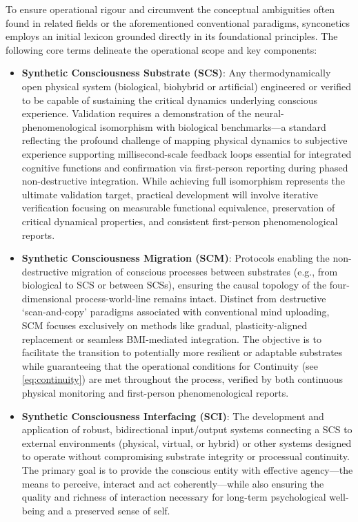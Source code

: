 \documentclass[10pt]{article}
\begin{document}
\begin{sloppypar}
  To ensure operational rigour and circumvent the conceptual ambiguities often found in related fields or the aforementioned conventional paradigms, synconetics employs an initial lexicon grounded directly in its foundational principles. The following core terms delineate the operational scope and key components:

  \begin{itemize}
    \item \textbf{Synthetic Consciousness Substrate (SCS)}: Any thermodynamically open physical system (biological, biohybrid or artificial) engineered or verified to be capable of sustaining the critical dynamics underlying conscious experience. Validation requires a demonstration of the neural-phenomenological isomorphism with biological benchmarks—a standard reflecting the profound challenge of mapping physical dynamics to subjective experience supporting millisecond-scale feedback loops essential for integrated cognitive functions and confirmation via first-person reporting during phased non-destructive integration. While achieving full isomorphism represents the ultimate validation target, practical development will involve iterative verification focusing on measurable functional equivalence, preservation of critical dynamical properties, and consistent first-person phenomenological reports.

    \item \textbf{Synthetic Consciousness Migration (SCM)}: Protocols enabling the non-destructive migration of conscious processes between substrates (e.g., from biological to SCS or between SCSs), ensuring the causal topology of the four-dimensional process-world-line remains intact. Distinct from destructive ‘scan-and-copy’ paradigms associated with conventional mind uploading, SCM focuses exclusively on methods like gradual, plasticity-aligned replacement or seamless BMI-mediated integration. The objective is to facilitate the transition to potentially more resilient or adaptable substrates while guaranteeing that the operational conditions for Continuity (see \autoref{eq:continuity}) are met throughout the process, verified by both continuous physical monitoring and first-person phenomenological reports.

    \item \textbf{Synthetic Consciousness Interfacing (SCI)}: The development and application of robust, bidirectional input/output systems connecting a SCS to external environments (physical, virtual, or hybrid) or other systems designed to operate without compromising substrate integrity or processual continuity. The primary goal is to provide the conscious entity with effective agency—the means to perceive, interact and act coherently—while also ensuring the quality and richness of interaction necessary for long-term psychological well-being and a preserved sense of self.


\end{itemize}
\end{sloppypar}
\end{document}

